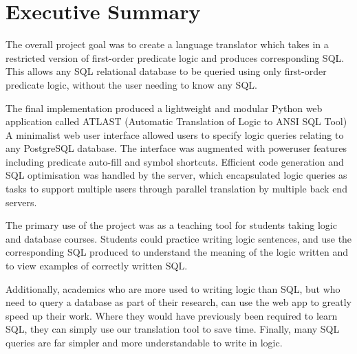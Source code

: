 \documentclass[a4paper, 11pt]{article}
\begin{document}
\renewcommand{\contentsname}{\huge Contents \vspace{1cm}}
\tableofcontents
\clearpage

\setlength{\parskip}{0.3cm} \setlength{\parindent}{0cm}

\section{Executive Summary}

  The overall project goal was to create a language translator which
  takes in a restricted version of first-order predicate logic and
  produces corresponding SQL. This allows any SQL relational
  database to be queried using only first-order predicate logic, without the
  user needing to know any SQL.

  The final implementation produced a lightweight and modular Python web
  application called ATLAST (Automatic Translation of Logic to ANSI SQL Tool)
  A minimalist web user interface allowed users to specify logic queries
  relating to any PostgreSQL database. The interface was augmented
  with poweruser features including predicate auto-fill and symbol shortcuts.
  Efficient code generation and SQL optimisation was handled by the server,
  which encapsulated logic queries as tasks to support multiple users through
  parallel translation by multiple back end servers.

  The primary use of the project was as a teaching tool for students taking
  logic and database courses. Students could practice writing logic sentences,
  and use the corresponding SQL produced to understand the meaning of the logic
  written and to view examples of correctly written SQL.

  Additionally, academics who are more used to writing logic than SQL, but who
  need to query a database as part of their research, can use the web app to
  greatly speed up their work. Where they would have previously been required to
  learn SQL, they can simply use our translation tool to save time. Finally,
  many SQL queries are far simpler and more understandable to write in logic.
\end{document}
